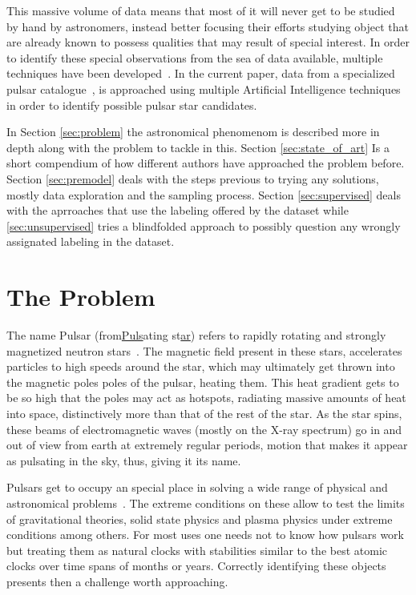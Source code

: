 \documentclass[journal]{IEEEtran}
\begin{document}
This massive volume of data means that most of it will never get to be studied
by hand by astronomers, instead better focusing their efforts studying object
that are already known to possess qualities that may result of special interest.
In order to identify these special observations from the sea of data available,
multiple techniques have been developed~\cite{pulsar:dataset:explanation:lyon}.
In the current paper, data from a specialized pulsar
catalogue~\cite{pulsar:dataset:lyon}, is approached using multiple Artificial
Intelligence techniques in order to identify possible pulsar star candidates.

In Section \ref{sec:problem} the astronomical phenomenom is described more in
 depth along with the problem to tackle in this. Section \ref{sec:state_of_art}
 Is a short compendium of how different authors have approached the problem
 before. Section \ref{sec:premodel} deals with the steps previous to trying any
 solutions, mostly data exploration and the sampling process. Section
 \ref{sec:supervised} deals with the aprroaches that use the labeling offered
 by the dataset while \ref{sec:unsupervised} tries a blindfolded approach to
 possibly question any wrongly assignated labeling in the dataset.

\section{The Problem\label{sec:problem}}

The name Pulsar (from\underline{Puls}ating st\underline{ar}) refers to rapidly
rotating and strongly magnetized neutron stars~\cite{pulsar:definition:nasa}.
The magnetic field present in these stars, accelerates particles to high speeds
around the star, which may ultimately get thrown into the magnetic poles poles
of the pulsar, heating them. This heat gradient gets to be so high that the
poles may act as hotspots, radiating massive amounts of heat into space,
distinctively more than that of the rest of the star. As the star spins, these
beams of electromagnetic waves (mostly on the X-ray spectrum) go in and out of
view from earth at extremely regular periods, motion that makes it appear as
pulsating in the sky, thus, giving it its name.

Pulsars get to occupy an special place in solving a wide range of physical and
astronomical problems~\cite{pulsar:importance:kramer}. The extreme conditions on
these allow to test the limits of gravitational theories, solid state physics
and plasma physics under extreme conditions among others. For most uses one
needs not to know how pulsars work but treating them as natural clocks with
stabilities similar to the best atomic clocks over time spans of months or
years. Correctly identifying these objects presents then a challenge worth
approaching.
\end{document}
